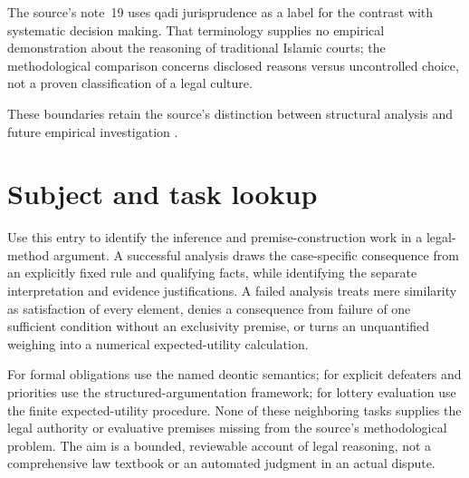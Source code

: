 The source's note~19 uses qadi jurisprudence as a label for the contrast
with systematic decision making. That terminology supplies no empirical
demonstration about the reasoning of traditional Islamic courts; the
methodological comparison concerns disclosed reasons versus uncontrolled
choice, not a proven classification of a legal culture.

These boundaries retain the source's distinction between structural
analysis and future empirical investigation
\parencite[pp.~660, 664--665, notes~7, 9--12, 15 on p.~665]{Hilgendorf2021LegalLogic}.

\section{Subject and task lookup}
\label{sec:p11-rat113-lookup}

Use this entry to identify the inference and premise-construction work in a
legal-method argument. A successful analysis draws the case-specific
consequence from an explicitly fixed rule and qualifying facts, while
identifying the separate interpretation and evidence justifications.
A failed analysis treats mere similarity as satisfaction of every element,
denies a consequence from failure of one sufficient condition without an
exclusivity premise, or turns an unquantified weighing into a numerical
expected-utility calculation.

For formal obligations use the named deontic semantics; for explicit
defeaters and priorities use the structured-argumentation framework; for
lottery evaluation use the finite expected-utility procedure. None of these
neighboring tasks supplies the legal authority or evaluative premises
missing from the source's methodological problem. The aim is a bounded,
reviewable account of legal reasoning, not a comprehensive law textbook or
an automated judgment in an actual dispute.
